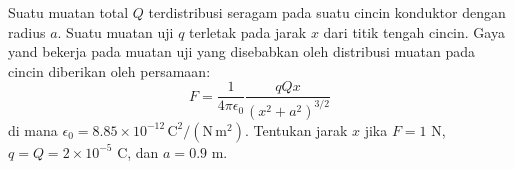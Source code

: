 \begin{soal}
Suatu muatan total $Q$ terdistribusi seragam pada suatu cincin konduktor
dengan radius $a$. Suatu muatan uji $q$ terletak pada jarak $x$
dari titik tengah cincin. Gaya yand bekerja pada muatan uji yang disebabkan
oleh distribusi muatan pada cincin diberikan oleh persamaan:
\begin{equation*}
F = \frac{1}{4\pi\epsilon_{0}}\frac{qQx}{\left( x^2 + a^2 \right)^{3/2}}
\end{equation*}
di mana $\epsilon_{0} = 8.85\times 10^{-12}\,\mathrm{C}^2/(\mathrm{N}\,\mathrm{m}^{2})$.
Tentukan jarak $x$ jika $F = 1$ N, $q = Q = 2\times 10^{-5}$ C, dan $a = 0.9$ m.
\end{soal}